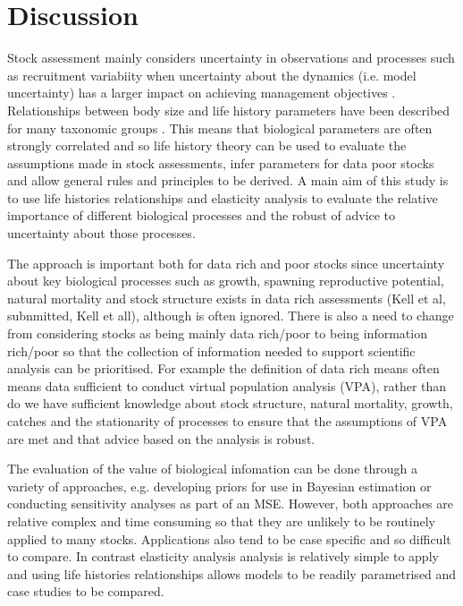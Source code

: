 \documentclass[10pt]{article}
\begin{document}
\section*{Discussion}

Stock assessment mainly considers uncertainty in observations and processes such as recruitment variabiity when uncertainty about the dynamics 
(i.e. model uncertainty) has a larger impact on achieving management objectives \cite{punt2008refocusing}. Relationships between body size and 
life history parameters have been described for many taxonomic groups \cite{blueweiss1978relationships}. This means that biological parameters 
are often strongly correlated and so life history theory can be used to evaluate the assumptions made in stock assessments, infer parameters 
for data poor stocks and allow general rules and principles to be derived. A main aim of this study is to use life histories relationships and 
elasticity analysis to evaluate the relative importance of different biological processes and the robust of advice to uncertainty about those 
processes. 

The approach is important both for data rich and poor stocks since uncertainty about key biological processes such as growth, spawning reproductive  
potential, natural mortality and stock structure exists in data rich assessments (Kell et al, subnmitted, Kell et all), although is often ignored.
There is also a need to change from considering stocks as being mainly data rich/poor to being information rich/poor so that the collection of 
information needed to support scientific analysis can be prioritised. For example the definition of data rich means often means data sufficient 
to conduct virtual population analysis (VPA), rather than do we have sufficient knowledge about stock structure, natural mortality, growth, catches 
and the stationarity of processes to ensure that the assumptions of VPA are met and that advice based on the analysis is robust.
 
The evaluation of the value of biological infomation can be done through a variety of approaches, e.g. developing priors for use in Bayesian estimation 
or conducting sensitivity analyses as part of an MSE. However, both approaches are relative complex and time consuming so that they are unlikely to be 
routinely applied to many stocks. Applications also tend to be case specific and so difficult to compare. In contrast elasticity analysis analysis is 
relatively simple to apply and using life histories relationships allows models to be readily parametrised and case studies to be compared. 
\end{document}
